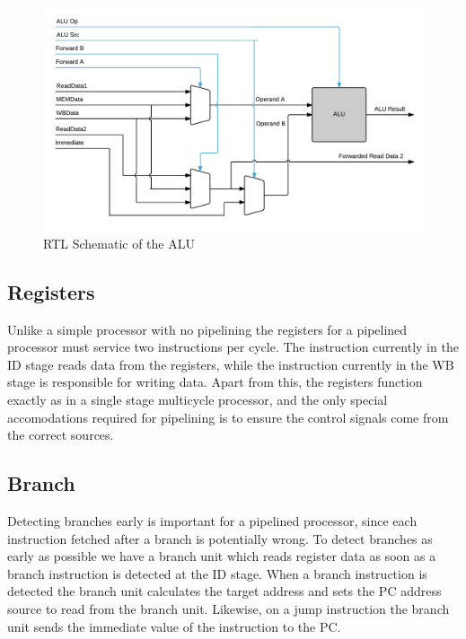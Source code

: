 \begin{figure}[h!]
    \includegraphics[width=\linewidth]{img/ALU.png}
    \caption{RTL Schematic of the ALU}
    \label{fig:ALU}
\end{figure}

\subsection{Registers}
Unlike a simple processor with no pipelining the registers for a pipelined processor must service two instructions per cycle.
The instruction currently in the ID stage reads data from the registers, while the instruction currently in the WB stage is responsible for writing data.
Apart from this, the registers function exactly as in a single stage multicycle processor, and the only special accomodations required for pipelining is to ensure the control signals come from the correct sources.

\subsection{Branch}
Detecting branches early is important for a pipelined processor, since each instruction fetched after a branch is potentially wrong.
To detect branches as early as possible we have a branch unit which reads register data as soon as a branch instruction is detected at the ID stage.
When a branch instruction is detected the branch unit calculates the target address and sets the PC address source to read from the branch unit.
Likewise, on a jump instruction the branch unit sends the immediate value of the instruction to the PC.

